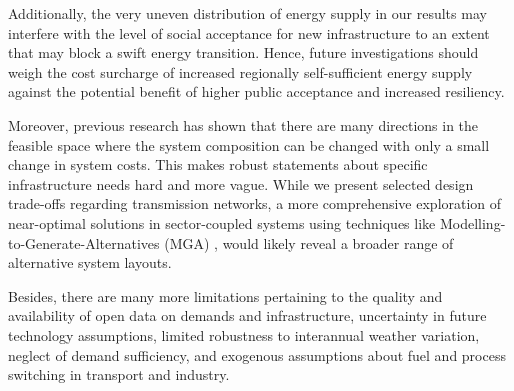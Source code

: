 
Additionally, the very uneven distribution of energy supply in our results may
interfere with the level of social acceptance for new infrastructure to an
extent that may block a swift energy transition. Hence, future investigations
should weigh the cost surcharge of increased regionally self-sufficient energy
supply against the potential benefit of higher public acceptance and increased
resiliency.


Moreover, previous research has shown that there are many directions in the
feasible space where the system composition can be changed with only a small
change in system costs. This makes robust statements about specific
infrastructure needs hard and more vague. While we present selected design
trade-offs regarding transmission networks, a more comprehensive exploration of
near-optimal solutions in sector-coupled systems using techniques like
Modelling-to-Generate-Alternatives (MGA)
\cite{Neumann2019,lombardiPolicyDecision2020,pedersenModelingAll2020,pickeringDiversityOptions},
would likely reveal a broader range of alternative system layouts.


Besides, there are many more limitations pertaining to the quality and
availability of open data on demands and infrastructure, uncertainty in future
technology assumptions, limited robustness to interannual weather variation,
neglect of demand sufficiency, and exogenous assumptions about fuel and process
switching in transport and industry. %
